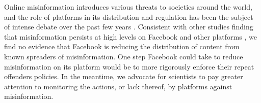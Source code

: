 \documentclass[11pt,a4paper]{article}
\begin{document}
Online misinformation introduces various threats to societies around the world, and the role of platforms in its distribution and regulation has been the subject of intense debate over the past few years \citep{rogers2020deplatforming, de2020internet}. 
Consistent with other studies finding that misinformation persists at high levels on Facebook and other platforms \citep{kornbluh2020new, resnick2018iffy}, we find no evidence that Facebook is reducing the distribution of content from known spreaders of misinformation. 
One step Facebook could take to reduce misinformation on its platform would be to more rigorously enforce their repeat offenders policies. 
In the meantime, we advocate for scientists to pay greater attention to monitoring the actions, or lack thereof, by platforms against misinformation. 

 


\end{document}
